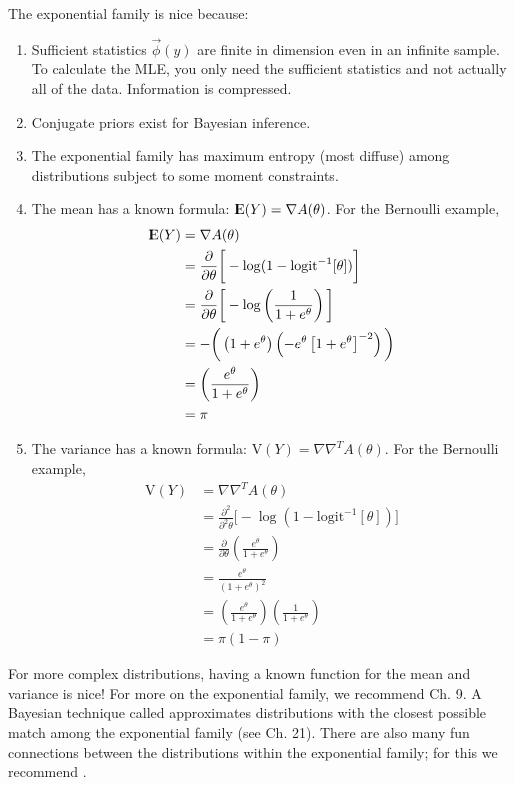 \documentclass[11pt]{article}
\newcommand{\E}{{\rm I\kern-.3em E}}
\newcommand{\V}{\text{V}}
\newcommand{\logit}{\text{logit}}
\newcommand{\bgreen}[1]{\textbf{\color{olive}{#1}}}
\begin{document}
The exponential family is nice because:
\begin{enumerate}
\item Sufficient statistics $\vec\phi(y)$ are finite in dimension even in an infinite sample. To calculate the MLE, you only need the sufficient statistics and not actually all of the data. Information is compressed.
\item Conjugate priors exist for Bayesian inference.
\item The exponential family has maximum entropy (most diffuse) among distributions subject to some moment constraints.
\item The mean has a known formula: $\E(Y) = \nabla A(\theta)$. For the Bernoulli example, 
$$\begin{aligned}
\E(Y) &= \nabla A(\theta) \\
&= \frac{\partial}{\partial \theta} \bigg[-\log(1 - \logit^{-1}[\theta])\bigg] \\
&= \frac{\partial}{\partial \theta} \bigg[-\log\left(\frac{1}{1 + e^{\theta}}\right)\bigg] \\
&= -\bigg(\left(1 + e^{\theta}\right)\left(-e^\theta \left[1 + e^\theta\right]^{-2}\right)\bigg) \\
&= \left(\frac{e^\theta}{1 + e^\theta}\right) \\
&= \pi
\end{aligned}$$
\item The variance has a known formula: $\V(Y) = \nabla \nabla^T A(\theta)$. For the Bernoulli example,
$$\begin{aligned}
\V(Y) &= \nabla \nabla^T A(\theta) \\
&= \frac{\partial^2}{\partial^2 \theta} \bigg[-\log(1 - \logit^{-1}[\theta])\bigg] \\
&= \frac{\partial}{\partial \theta} \left(\frac{e^\theta}{1 + e^\theta}\right) \\
&= \frac{e^\theta}{\left(1 + e^\theta\right)^2} \\
&= \left(\frac{e^\theta}{1 + e^\theta}\right)\left(\frac{1}{1 + e^\theta}\right) \\
&= \pi(1 - \pi)
\end{aligned}$$
\end{enumerate}

For more complex distributions, having a known function for the mean and variance is nice! For more on the exponential family, we recommend \citet{murphy2012} Ch. 9. A Bayesian technique called \bgreen{variational inference} approximates distributions with the closest possible match among the exponential family (see \citealt{murphy2012} Ch. 21). There are also many fun connections between the distributions within the exponential family; for this we recommend \citet{blitzstein2014}.
\end{document}
